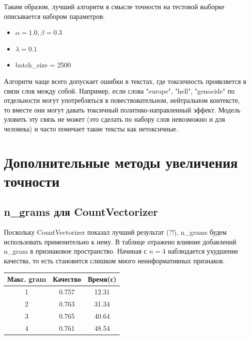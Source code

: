 \documentclass{article}
\begin{document}
                Таким образом, лучший алгоритм в смысле точности на тестовой выборке описывается набором параметров:
                \begin{itemize}
                    \item $\alpha = 1.0, \beta=0.3$
                    \item $\lambda = 0.1$
                    \item batch\_size = 2500
                \end{itemize}

                Алгоритм чаще всего допускает ошибки в текстах, где токсичность проявляется в связи слов между собой. Например, если слова "europe", "hell", "genocide" по отдельности могут употребляться в повествовательном, нейтральном контексте, то вместе они могут давать токсичный политико-направленный эффект. Модель уловить эту связь не может (это сделать по набору слов невозможно и для человека) и часто помечает такие тексты как нетоксичные.

    \section{Дополнительные методы увеличения точности}
        \subsection{n\_grams для CountVectorizer}
            Поскольку CountVectorizer показал лучший результат (?!), n\_grams будем использовать применительно к нему. В таблице отражено влияние добавлений n\_gram в признаковое пространство. Начиная с $n=4$ наблюдается ухудшение качества, то есть становится слишком много неинформативных признаков.
            \begin{center}
                \begin{tabular}{| c | c | c |}
                    \hline
                    Макс. gram & Качество & Время(с) \\
                    \hline
                    1 & 0.757 & 12.31 \\
                    \hline
                    2 & 0.763 & 31.34 \\
                    \hline
                    3 & 0.765 & 40.64 \\
                    \hline
                    4 & 0.761 & 48.54 \\
                    \hline
                \end{tabular}
            \end{center}
\end{document}
